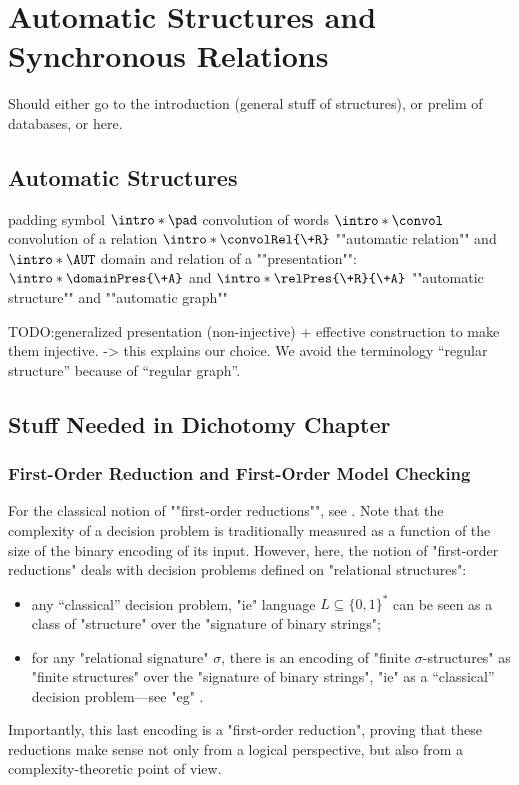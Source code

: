 \chapter{%
	\AP\label{ch:preliminaries-automatic-structures}
	Automatic Structures and Synchronous Relations%
}

Should either go to the introduction (general stuff of structures), or prelim of
databases, or here.

\section{Automatic Structures}

\begin{itemize}
	\itemAP padding symbol $\intro*\pad$
	\itemAP convolution of words $\intro*\convol$
	\itemAP convolution of a relation $\intro*\convolRel{\+R}$
	\itemAP ""automatic relation"" and $\intro*\AUT$
	\itemAP domain and relation of a ""presentation"": $\intro*\domainPres{\+A}$ and $\intro*\relPres{\+R}{\+A}$ 
	\itemAP ""automatic structure"" and ""automatic graph""
\end{itemize}

TODO:generalized presentation (non-injective) + effective construction to make them injective.
-> this explains our choice. We avoid the terminology ``regular structure'' because of
``regular graph''.

\section{Stuff Needed in Dichotomy Chapter}

\subsection{First-Order Reduction and First-Order Model Checking}

For the classical notion of \AP""first-order reductions"", see
\cite[Definition 2.11 \& Definition 1.26]{Immerman1998DescriptiveComplexity}.
Note that the complexity of a decision problem is traditionally measured
as a function of the size of the binary encoding of its input.
However, here, the notion of "first-order reductions" deals with
decision problems defined on "relational structures":
\begin{itemize}
	\item any ``classical'' decision problem, "ie" language $L \subseteq \{0,1\}^*$
		can be seen as a class of "structure" over the "signature of binary strings";
	\item for any "relational signature" $\sigma$,
		there is an encoding of "finite $\sigma$-structures" as "finite structures"
		over the "signature of binary strings", "ie" as a ``classical''
		decision problem---see "eg" \cite[\S~2.2]{Immerman1998DescriptiveComplexity}.
\end{itemize}
Importantly, this last encoding is a "first-order reduction", proving that these reductions
make sense not only from a logical perspective, but also from a complexity-theoretic point of
view.

